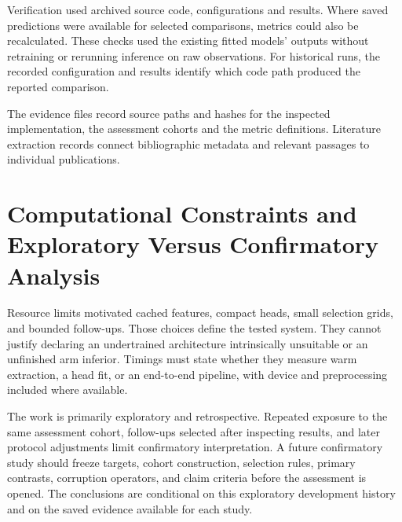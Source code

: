 Verification used archived source code, configurations and results. Where saved predictions were available for selected comparisons, metrics could also be recalculated. These checks used the existing fitted models' outputs without retraining or rerunning inference on raw observations. For historical runs, the recorded configuration and results identify which code path produced the reported comparison.

The evidence files record source paths and hashes for the inspected implementation, the assessment cohorts and the metric definitions. Literature extraction records connect bibliographic metadata and relevant passages to individual publications.

\section{Computational Constraints and Exploratory Versus Confirmatory Analysis}
Resource limits motivated cached features, compact heads, small selection grids, and bounded follow-ups. Those choices define the tested system. They cannot justify declaring an undertrained architecture intrinsically unsuitable or an unfinished arm inferior. Timings must state whether they measure warm extraction, a head fit, or an end-to-end pipeline, with device and preprocessing included where available.

The work is primarily exploratory and retrospective. Repeated exposure to the same assessment cohort, follow-ups selected after inspecting results, and later protocol adjustments limit confirmatory interpretation. A future confirmatory study should freeze targets, cohort construction, selection rules, primary contrasts, corruption operators, and claim criteria before the assessment is opened. The conclusions are conditional on this exploratory development history and on the saved evidence available for each study.
